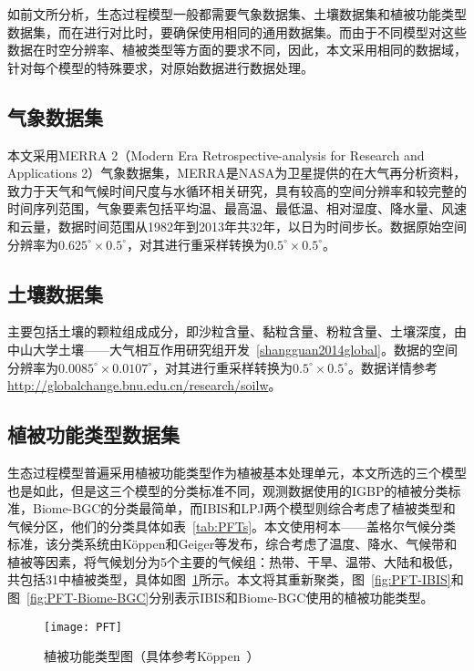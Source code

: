 如前文所分析，生态过程模型一般都需要气象数据集、土壤数据集和植被功能类型数据集，而在进行对比时，要确保使用相同的通用数据集。而由于不同模型对这些数据在时空分辨率、植被类型等方面的要求不同，因此，本文采用相同的数据域，针对每个模型的特殊要求，对原始数据进行数据处理。

\subsection{气象数据集}
本文采用MERRA 2（Modern Era Retrospective-analysis for Research and Applications 2）气象数据集，MERRA是NASA为卫星提供的在大气再分析资料，致力于天气和气候时间尺度与水循环相关研究，具有较高的空间分辨率和较完整的时间序列范围，气象要素包括平均温、最高温、最低温、相对湿度、降水量、风速和云量，数据时间范围从1982年到2013年共32年，以日为时间步长。数据原始空间分辨率为$0.625^{\circ} \times 0.5^{\circ}$，对其进行重采样转换为$0.5^{\circ} \times 0.5^{\circ}$。

\subsection{土壤数据集}
主要包括土壤的颗粒组成成分，即沙粒含量、黏粒含量、粉粒含量、土壤深度，由中山大学土壤——大气相互作用研究组开发~\ref{shangguan2014global}。数据的空间分辨率为$0.0085^{\circ} \times 0.0107^{\circ}$，对其进行重采样转换为$0.5^{\circ} \times 0.5^{\circ}$。数据详情参考\href{http://globalchange.bnu.edu.cn/research/soilw}{http://globalchange.bnu.edu.cn/research/soilw}。

\subsection{植被功能类型数据集}
生态过程模型普遍采用植被功能类型作为植被基本处理单元，本文所选的三个模型也是如此，但是这三个模型的分类标准不同，观测数据使用的IGBP的植被分类标准，Biome-BGC的分类最简单，而IBIS和LPJ两个模型则综合考虑了植被类型和气候分区，他们的分类具体如表~\ref{tab:PFTs}。本文使用柯本——盖格尔气候分类标准，该分类系统由K\"{o}ppen和Geiger等发布，综合考虑了温度、降水、气候带和植被等因素，将气候划分为5个主要的气候组：热带、干旱、温带、大陆和极低，共包括31中植被类型，具体如图~\ref{fig:PFT}所示。本文将其重新聚类，图~\ref{fig:PFT-IBIS}和图~\ref{fig:PFT-Biome-BGC}分别表示IBIS和Biome-BGC使用的植被功能类型。


\begin{figure}[!h]
    \centering
    \texttt{[image: PFT]}
    \caption{植被功能类型图（具体参考K\"{o}ppen~\cite{peel2007updated}）}
    \label{fig:PFT}
\end{figure}

